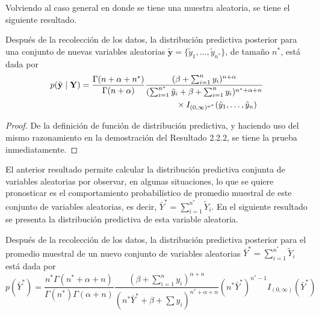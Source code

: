     Volviendo al caso general en donde se tiene una muestra aleatoria, se tiene el siguiente resultado.
    
    \begin{Res}
    Despu\'es de la recolecci\'on de los datos, la distribuci\'on predictiva posterior para una conjunto de nuevas variables aleatorias $\tilde{\mathbf{y}}=\{\tilde{y}_1,\ldots,\tilde{y}_{n^*}\}$, de tama\~no $n^*$, est\'a dada por
    \begin{align}
    p(\tilde{\mathbf{y}} \mid \mathbf{Y})&=
    \frac{\Gamma(n+\alpha+n^{*})}{\Gamma(n+\alpha)}
    \frac{(\beta+\sum_{i=1}^ny_i)^{n+\alpha}}{(\sum_{i=1}^{n^*}\tilde{y}_i+\beta+\sum_{i=1}^ny_i)^{n^*+\alpha+n}}\notag\\
    &\hspace{4cm}\times
    I_{(0,\infty)^{n^*}}(\tilde{y}_1,\ldots,\tilde{y}_n)
    \end{align}
    \end{Res}
    
    \begin{proof}
    De la definici\'on de funci\'on de distribuci\'on predictiva, y haciendo uso del mismo razonamiento en la demostraci\'on del Resultado 2.2.2, se tiene la prueba inmediatamente.
    \end{proof}
    
    El anterior resultado permite calcular la distribuci\'on predictiva conjunta de variables aleatorias por observar, en algunas situaciones, lo que se quiere pronosticar es el comportamiento probabil\'istico de promedio muestral de este conjunto de variables aleatorias, es decir, $\bar{Y}^*=\sum_{i=1}^{n^*}\tilde{Y}_i$. En el siguiente resultado se presenta la distribuci\'on predictiva de esta variable aleatoria.
    \begin{Res}
    Despu\'es de la recolecci\'on de los datos, la distribuci\'on predictiva posterior para el promedio muestral de un nuevo conjunto de variables aleatorias $\bar{Y}^*=\sum_{i=1}^{n^*}\tilde{Y}_i$ est\'a dada por
    \begin{equation*}
    p(\bar{Y}^*)=\frac{n^*\Gamma(n^*+\alpha+n)}{\Gamma(n^*)\Gamma(\alpha+n)}\frac{(\beta+\sum_{i=1}^ny_i)^{\alpha+n}}{(n^*\bar{Y}^*+\beta+\sum y_i)^{n^*+\alpha+n}}(n^*\bar{Y}^*)^{n^*-1}I_{(0,\infty)}(\bar{Y}^*)
    \end{equation*}
    \end{Res}
    
